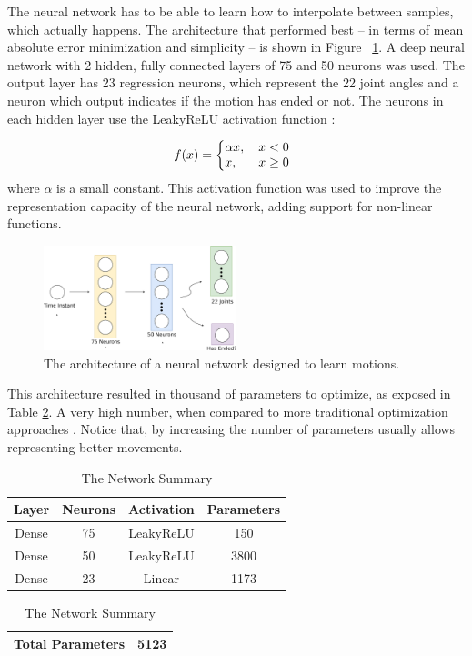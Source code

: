The neural network has to be able to learn how to interpolate between samples, which actually happens. The architecture that performed best -- in terms of mean absolute error minimization and simplicity -- is shown in Figure ~\ref{fig:model_plot}. A deep neural network with 2 hidden, fully connected layers of 75 and 50 neurons was used. The output layer has 23 regression neurons, which represent the 22 joint angles and a neuron which output indicates if the motion has ended or not. The neurons in each hidden layer use the LeakyReLU activation function \cite{leakyrelu}: 

\[
  f(x) = \left\{
     \begin{array}{@{}l@{\thinspace}l}
       \alpha x,   & \quad x < 0  \\
       x, & \quad x \ge0 \\
     \end{array}
   \right.
\]
where $\alpha$ is a small constant. This activation function was used to improve the representation capacity of the neural network, adding support for non-linear functions.

\begin{figure}[!htbp]
\centering
\includegraphics[width=0.5\textwidth]{Cap5/architecture}
\caption{The architecture of a neural network designed to learn motions.}
\label{fig:model_plot}
\end{figure}

This architecture resulted in thousand of parameters to optimize, as exposed in Table \ref{tab:network_summary}. A very high number, when compared to more traditional optimization approaches \cite{AAAI12-MacAlpine}. Notice that, by increasing the number of parameters usually allows representing better movements.

\begin{table}[htbp]
\caption{The Network Summary}
\begin{center}
\begin{tabular}{|c|c|c|c|}
\hline
\textbf{Layer}&{\textbf{Neurons}}& \textbf{Activation}& \textbf{Parameters} \\
\hline
Dense & 75 & LeakyReLU & 150  \\
\hline
Dense & 50 & LeakyReLU & 3800 \\
\hline
Dense & 23 & Linear & 1173 \\
\hline
\end{tabular}
\begin{tabular}{|c|c|}
\hline
\textbf{Total Parameters} & 5123 \\
\hline
\end{tabular}
\label{tab:network_summary}
\end{center}
\end{table}


